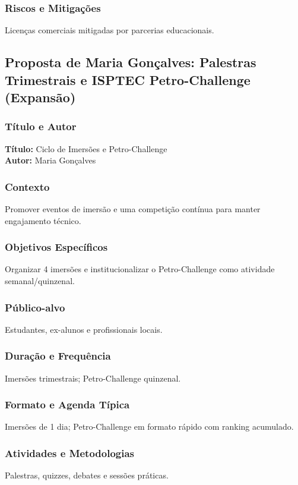 \documentclass[12pt,a4paper]{article}
\begin{document}
\subsubsection*{Riscos e Mitigações}
Licenças comerciais mitigadas por parcerias educacionais.

\subsection{Proposta de Maria Gonçalves: Palestras Trimestrais e ISPTEC Petro-Challenge (Expansão)}

\subsubsection*{Título e Autor}
\textbf{Título:} Ciclo de Imersões e Petro-Challenge \\
\textbf{Autor:} Maria Gonçalves

\subsubsection*{Contexto}
Promover eventos de imersão e uma competição contínua para manter engajamento técnico.

\subsubsection*{Objetivos Específicos}
Organizar 4 imersões e institucionalizar o Petro-Challenge como atividade semanal/quinzenal.

\subsubsection*{Público-alvo}
Estudantes, ex-alunos e profissionais locais.

\subsubsection*{Duração e Frequência}
Imersões trimestrais; Petro-Challenge quinzenal.

\subsubsection*{Formato e Agenda Típica}
Imersões de 1 dia; Petro-Challenge em formato rápido com ranking acumulado.

\subsubsection*{Atividades e Metodologias}
Palestras, quizzes, debates e sessões práticas.
\end{document}
